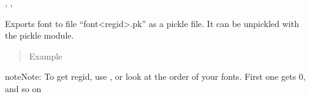 \documentclass[letterpaper,10pt,english]{sphinxmanual}
\begin{document}
\begin{fulllineitems}


{\hyperref[\detokenize{pypoints:pypoints.Color}]{}}, {\hyperref[\detokenize{pypoints:pypoints.Point}]{}}, {\hyperref[\detokenize{pypoints:pypoints.Blueprint}]{}}



\begin{fulllineitems}
\label{\detokenize{pypoints:pypoints.Font.export}}
Exports font to file “font\textless{}regid\textgreater{}.pk” as a pickle file. It can be unpickled with the pickle module.
\begin{quote}\begin{description}
\item[{Example}] \leavevmode
\end{description}\end{quote}

\begin{sphinxVerbatim}[commandchars=\\\{\}]
\end{sphinxVerbatim}

\begin{sphinxadmonition}{note}{Note:}
To get regid, use , or look at the order of your fonts. First one gets 0, and so on
\end{sphinxadmonition}




{\hyperref[\detokenize{pypoints:pypoints.FontRegistry}]{}}



\end{fulllineitems}


\end{fulllineitems}

\end{document}
